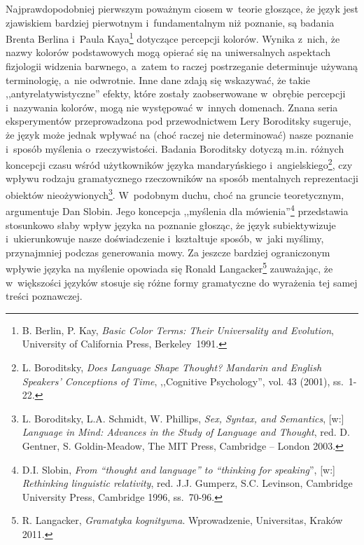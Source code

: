 Najprawdopodobniej pierwszym poważnym ciosem w~teorie głoszące, że język jest zjawiskiem bardziej pierwotnym i~fundamentalnym niż poznanie, są badania Brenta Berlina i~Paula Kaya\footnote{B. Berlin, P. Kay, \textit{Basic Color Terms: Their Universality and Evolution}, University of California Press, Berkeley~1991.} dotyczące percepcji kolorów. Wynika z~nich, że nazwy kolorów podstawowych mogą opierać się na uniwersalnych aspektach fizjologii widzenia barwnego, a~zatem to raczej postrzeganie determinuje używaną terminologię, a~nie odwrotnie. Inne dane zdają się wskazywać, że takie ,,antyrelatywistyczne'' efekty, które zostały zaobserwowane w~obrębie percepcji i~nazywania kolorów, mogą nie występować w~innych domenach. Znana seria eksperymentów przeprowadzona pod przewodnictwem Lery Boroditsky sugeruje, że język może jednak wpływać na (choć raczej nie determinować) nasze poznanie i~sposób myślenia o~rzeczywistości. Badania Boroditsky dotyczą m.in. różnych koncepcji czasu wśród użytkowników języka mandaryńskiego i~angielskiego\footnote{L. Boroditsky, \textit{Does Language Shape Thought? Mandarin and English Speakers' Conceptions of Time}, ,,Cognitive Psychology'', vol. 43 (2001), ss.~1-22.}, czy wpływu rodzaju gramatycznego rzeczowników na sposób mentalnych reprezentacji obiektów nieożywionych\footnote{L. Boroditsky, L.A. Schmidt, W. Phillips, \textit{Sex, Syntax, and Semantics}, [w:] \textit{Language in Mind: Advances in the Study of Language and Thought}, red. D. Gentner, S. Goldin-Meadow, The MIT Press, Cambridge -- London 2003.}. W~podobnym duchu, choć na gruncie teoretycznym, argumentuje Dan Slobin. Jego koncepcja ,,myślenia dla mówienia''\footnote{D.I. Slobin, \textit{From ``thought and language'' to ``thinking for speaking}'', [w:] \textit{Rethinking linguistic relativity}, red. J.J. Gumperz, S.C. Levinson, Cambridge University Press, Cambridge 1996, ss.~70-96.} przedstawia stosunkowo słaby wpływ języka na poznanie głosząc, że język subiektywizuje i~ukierunkowuje nasze doświadczenie i~kształtuje sposób, w~jaki myślimy, przynajmniej podczas generowania mowy. Za jeszcze bardziej ograniczonym wpływie języka na myślenie opowiada się Ronald Langacker\footnote{R. Langacker, \textit{Gramatyka kognitywna}. Wprowadzenie, Universitas, Kraków 2011.} zauważając, że w~większości języków stosuje się różne formy gramatyczne do wyrażenia tej samej treści poznawczej.

